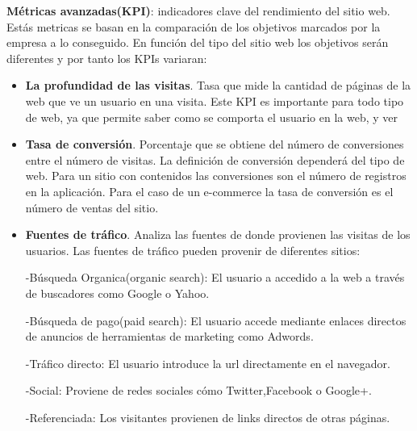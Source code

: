 \vspace{5 mm}

\textbf{Métricas avanzadas(KPI)}: indicadores clave del rendimiento del sitio web. Estás metricas se basan en la comparación de los objetivos marcados por la empresa a lo conseguido. En función del tipo del sitio web los objetivos serán diferentes y por tanto los KPIs variaran:

\begin{itemize}

\item \textbf{La profundidad de las visitas}. Tasa que mide la cantidad de páginas de la web que ve un usuario en una visita. Este KPI es importante para todo tipo de web, ya que permite saber como se comporta el usuario en la web, y ver

\item \textbf{Tasa de conversión}. Porcentaje que se obtiene del número de conversiones entre el número de visitas. La definición de conversión dependerá del tipo de web. Para un sitio con contenidos las conversiones son el número de registros en la aplicación. Para el caso de un e-commerce la tasa de conversión es el número de ventas del sitio.

\item \textbf{Fuentes de tráfico}. Analiza las fuentes de donde provienen las visitas de los usuarios. Las fuentes de tráfico pueden provenir de diferentes sitios:

-Búsqueda Organica(organic search): El usuario a accedido a la web a través de buscadores como Google o Yahoo.

\vspace{5 mm}

-Búsqueda de pago(paid search): El usuario accede mediante enlaces directos de anuncios de herramientas de marketing como Adwords.

\vspace{5 mm}

-Tráfico directo: El usuario introduce la url directamente en el navegador.

\vspace{5 mm}

-Social: Proviene de redes sociales cómo Twitter,Facebook o Google+.

\vspace{5 mm}

-Referenciada: Los visitantes provienen de links directos de otras páginas.
 

\end{itemize}

